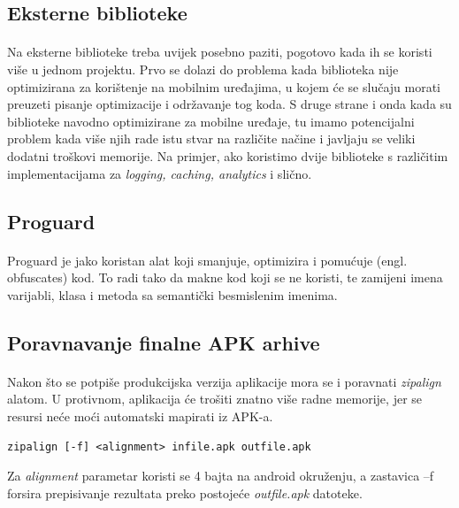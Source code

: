 \documentclass[times, utf8, zavrsni]{fer}
\begin{document}
\subsection{Eksterne biblioteke}
\paragraph{}
Na eksterne biblioteke treba uvijek posebno paziti, pogotovo kada ih se koristi više u jednom projektu. Prvo se dolazi do problema kada biblioteka nije optimizirana za korištenje na mobilnim uređajima, u kojem će se slučaju morati preuzeti pisanje optimizacije i održavanje tog koda. S druge strane i onda kada su biblioteke navodno optimizirane za mobilne uređaje, tu imamo potencijalni problem kada više njih rade istu stvar na različite načine i javljaju se veliki dodatni troškovi memorije. Na primjer, ako koristimo dvije biblioteke s različitim implementacijama za \textit{logging, caching, analytics} i slično.

\subsection{Proguard}
\paragraph{}
Proguard je jako koristan alat koji smanjuje, optimizira i pomućuje (engl. obfuscates) kod. To radi tako da makne kod koji se ne koristi, te zamijeni imena varijabli, klasa i metoda sa semantički besmislenim imenima. 

\subsection{Poravnavanje finalne APK arhive}
\paragraph{}
Nakon što se potpiše produkcijska verzija aplikacije mora se i poravnati \textit{zipalign} alatom. U protivnom, aplikacija će trošiti znatno više radne memorije, jer se resursi neće moći automatski mapirati iz APK-a.

\begin{center}
\verb|zipalign [-f] <alignment> infile.apk outfile.apk|
\end{center}

Za \textit{alignment} parametar koristi se 4 bajta na android okruženju, a zastavica –f forsira prepisivanje rezultata preko postojeće \textit{outfile.apk} datoteke.
\end{document}
